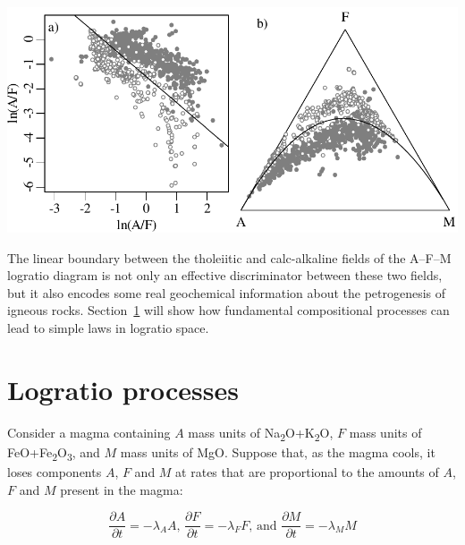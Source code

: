 \noindent\begin{minipage}[t][][b]{.7\textwidth}
\includegraphics[width=\textwidth]{../figures/LDAAFM.pdf}\\
\end{minipage}
\begin{minipage}[t][][t]{.3\textwidth}
  \label{fig:LDAAFM}
\end{minipage}

The linear boundary between the tholeiitic and calc-alkaline fields of
the A--F--M logratio diagram is not only an effective discriminator
between these two fields, but it also encodes some real geochemical
information about the petrogenesis of igneous
rocks. Section~\ref{sec:logratio-processes} will show how fundamental
compositional processes can lead to simple laws in logratio space.

\section{Logratio processes}
\label{sec:logratio-processes}

Consider a magma containing $A$ mass units of
Na\textsubscript{2}O+K\textsubscript{2}O, $F$ mass units of
FeO+Fe\textsubscript{2}O\textsubscript{3}, and $M$ mass units of
MgO. Suppose that, as the magma cools, it loses components $A$, $F$
and $M$ at rates that are proportional to the amounts of $A$, $F$ and
$M$ present in the magma:

\begin{equation}
  \frac{\partial A}{\partial t} = -\lambda_A A \mbox{,~}
  \frac{\partial F}{\partial t} = -\lambda_F F \mbox{,~and~}
  \frac{\partial M}{\partial t} = -\lambda_M M
  \label{eq:decay}
\end{equation}

